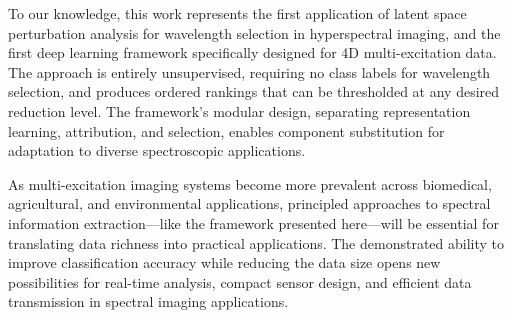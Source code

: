 To our knowledge, this work represents the first application of latent space perturbation analysis for wavelength selection in hyperspectral imaging, and the first deep learning framework specifically designed for 4D multi-excitation data.
The approach is entirely unsupervised, requiring no class labels for wavelength selection, and produces ordered rankings that can be thresholded at any desired reduction level.
The framework's modular design, separating representation learning, attribution, and selection, enables component substitution for adaptation to diverse spectroscopic applications.

As multi-excitation imaging systems become more prevalent across biomedical, agricultural, and environmental applications, principled approaches to spectral information extraction---like the framework presented here---will be essential for translating data richness into practical applications.
The demonstrated ability to improve classification accuracy while reducing the data size opens new possibilities for real-time analysis, compact sensor design, and efficient data transmission in spectral imaging applications.